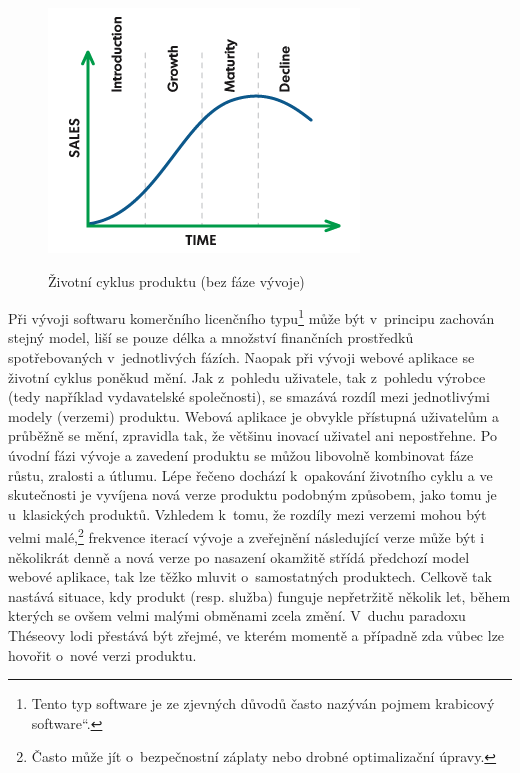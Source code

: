 \documentclass[12pt,twoside,openany]{fithesis}
\begin{document}
\begin{figure}[hbt]
    \hypertarget{fig-product-lifecycle}{}%
    \begin{center}

        
{{\includegraphics[]{img/product-lifecycle-simple}}\hypertarget{idp54862560}{}%
            \label{idp54862560}
        }
        {{\caption[{Životní cyklus produktu}]{{{Životní 
        cyklus produktu (bez fáze vývoje) \cite{product-lifecycle-graph}}}}\label{fig-product-lifecycle}}}
    \end{center}
\end{figure}

Při vývoji softwaru komerčního licenčního 
typu\footnote{
    Tento typ software je ze zjevných důvodů často nazýván pojmem \glqq 
krabicový software\textquotedblleft{}.}
může být v~principu 
zachován stejný model, liší se pouze délka a množství finančních 
prostředků spotřebovaných v~jednotlivých fázích. Naopak při vývoji 
webové aplikace se životní cyklus poněkud mění. Jak z~pohledu uživatele, 
tak z~pohledu výrobce (tedy například vydavatelské společnosti), se 
smazává rozdíl mezi jednotlivými modely (verzemi) produktu. Webová 
aplikace je obvykle přístupná uživatelům a průběžně se mění, 
zpravidla tak, že většinu inovací uživatel ani nepostřehne. Po úvodní 
fázi vývoje a zavedení produktu se můžou libovolně kombinovat fáze 
růstu, zralosti a útlumu. Lépe řečeno dochází k~opakování životního 
cyklu a ve skutečnosti je vyvíjena nová verze produktu podobným způsobem, 
jako tomu je u~klasických produktů. Vzhledem k~tomu, že rozdíly mezi 
verzemi mohou být velmi 
malé,\footnote{
    Často může jít o~bezpečnostní záplaty nebo drobné optimalizační 
úpravy.
} frekvence iterací 
vývoje a zveřejnění následující verze může být i několikrát denně 
a nová verze po nasazení okamžitě střídá předchozí model webové 
aplikace, tak lze těžko mluvit o~samostatných produktech. Celkově tak 
nastává situace, kdy produkt (resp. služba) funguje nepřetržitě několik 
let, během kterých se ovšem velmi malými obměnami zcela změní. V~duchu 
paradoxu Théseovy lodi přestává být zřejmé, ve kterém momentě a 
případně zda vůbec lze hovořit o~nové verzi produktu. 
\cite{theseus-paradox}{}
\end{document}
